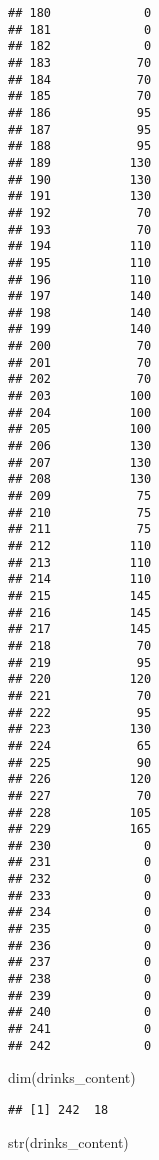 \documentclass[
]{article}
\newenvironment{Shaded}{\begin{snugshade}}{\end{snugshade}}
\newcommand{\FunctionTok}[1]{\textcolor[rgb]{0.00,0.00,0.00}{#1}}
\newcommand{\NormalTok}[1]{#1}
\begin{document}
\begin{verbatim}
## 180             0
## 181             0
## 182             0
## 183            70
## 184            70
## 185            70
## 186            95
## 187            95
## 188            95
## 189           130
## 190           130
## 191           130
## 192            70
## 193            70
## 194           110
## 195           110
## 196           110
## 197           140
## 198           140
## 199           140
## 200            70
## 201            70
## 202            70
## 203           100
## 204           100
## 205           100
## 206           130
## 207           130
## 208           130
## 209            75
## 210            75
## 211            75
## 212           110
## 213           110
## 214           110
## 215           145
## 216           145
## 217           145
## 218            70
## 219            95
## 220           120
## 221            70
## 222            95
## 223           130
## 224            65
## 225            90
## 226           120
## 227            70
## 228           105
## 229           165
## 230             0
## 231             0
## 232             0
## 233             0
## 234             0
## 235             0
## 236             0
## 237             0
## 238             0
## 239             0
## 240             0
## 241             0
## 242             0
\end{verbatim}

\begin{Shaded}
\begin{Highlighting}[]
\FunctionTok{dim}\NormalTok{(drinks\_content)}
\end{Highlighting}
\end{Shaded}

\begin{verbatim}
## [1] 242  18
\end{verbatim}

\begin{Shaded}
\begin{Highlighting}[]
\FunctionTok{str}\NormalTok{(drinks\_content)}
\end{Highlighting}
\end{Shaded}
\end{document}

